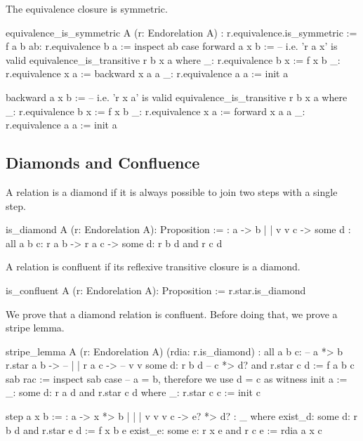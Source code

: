 The equivalence closure is symmetric.

\begin{alba}
  equivalence_is_symmetric
    A (r: Endorelation A)
    : r.equivalence.is_symmetric :=
    f a b ab: r.equivalence b a :=
      inspect ab case
        forward a x b :=   -- i.e. 'r a x' is valid
          equivalence_is_transitive r b x a where
            _: r.equivalence b x := f x b
            _: r.equivalence x a := backward x a a
            _: r.equivalence a a := init a

        backward a x b :=  -- i.e. 'r x a' is valid
          equivalence_is_transitive r b x a where
            _: r.equivalence b x := f x b
            _: r.equivalence x a := forward x a a
            _: r.equivalence a a := init a
\end{alba}






\subsection{Diamonds and Confluence}


A relation is a diamond if it is always possible to join two steps with a
single step.

\begin{alba}
  is_diamond A (r: Endorelation A): Proposition :=
      {:   a  ->  b
           |      |
           v      v
           c  -> some d :}
    all a b c:
      r a b
      -> r a c
      -> some d: r b d and r c d
\end{alba}


A relation is confluent if its reflexive transitive closure is a diamond.

\begin{alba}
  is_confluent A (r: Endorelation A): Proposition :=
    r.star.is_diamond
\end{alba}



We prove that a diamond relation is confluent. Before doing that, we prove a
stripe lemma.

\begin{alba}
  stripe_lemma
    A
    (r: Endorelation A)
    (rdia: r.is_diamond)
    : all a b c:                       --  a *> b
        r.star a b ->                  --  |    |
        r a c ->                       --  v    v
        some d: r b d                  --  c *> d?
                and
                r.star c d :=
     f a b c sab rac :=
       inspect sab case   -- a = b, therefore we use d = c as witness
         init a :=
           _: some d: r a d and r.star c d  where
             _: r.star c c := init c

         step a x b :=
           {:  a  -> x  *> b
               |     |     |
               v     v     v
               c  -> e? *> d? :}
           _ where
             exist_d: some d: r b d and r.star e d := f x b e
             exist_e: some e: r x e and r c e      := rdia a x c
\end{alba}


